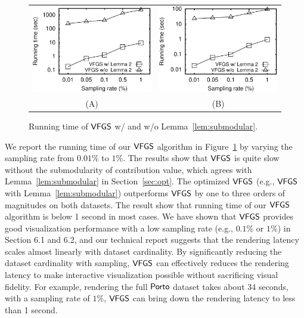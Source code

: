 \begin{figure}
 \centering
 \small
 \begin{tabular}{cc}
   \includegraphics[width=0.44\columnwidth]{pictures/tporto}
   &
   \includegraphics[width=0.44\columnwidth]{pictures/tshenzhen}
   \\
   (A) \pt{}
   &
   (B) \sz{}	
 \end{tabular}
 \vspace{-3mm}
 \caption{Running time of $\mathsf{VFGS}$ w/ and w/o Lemma~\ref{lem:submodular}.}
 \label{fig:cost}
 \vspace{-6mm}
\end{figure}


 We report the running time of our $\mathsf{VFGS}$ algorithm in Figure~\ref{fig:cost} by varying the sampling rate from $0.01\%$ to $1\%$. The results show that $\mathsf{VFGS}$ is quite slow without the submodularity of contribution value, which agrees with Lemma~\ref{lem:submodular} in Section~\ref{sec:opt}.
The optimized $\mathsf{VFGS}$ (e.g., $\mathsf{VFGS}$ with Lemma~\ref{lem:submodular}) outperforms $\mathsf{VFGS}$ by one to three orders of magnitudes on both datasets. The result show that running time of our $\mathsf{VFGS}$ algorithm is below 1 second in most cases. We have shown that $\mathsf{VFGS}$ provides good visualization performance with a low sampling rate (e.g., $0.1\%$ or $1\%$) in Section 6.1 and 6.2, and our technical report suggests that the rendering latency scales almost linearly with dataset cardinality. By significantly reducing the dataset cardinality with sampling, $\mathsf{VFGS}$ can effectively reduces the rendering latency to make interactive visualization possible without sacrificing visual fidelity. For example, rendering the full $\textsf{Porto}{}$ dataset takes about 34 seconds, with a sampling rate of $1\%$, $\mathsf{VFGS}$ can bring down the rendering latency to less than 1 second.




